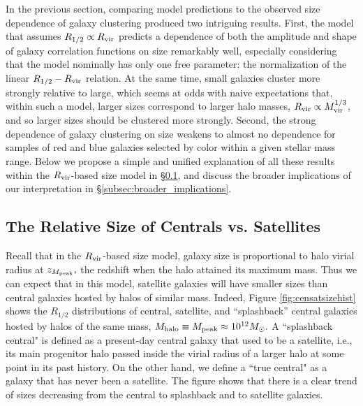 \documentclass[usenatbib,usegraphicx,letterpaper]{mn2e}
\newcommand{\rhalf}{R_{1/2}}
\newcommand{\mvir}{M_{\rm vir}}
\newcommand{\mpeak}{M_{\rm peak}}
\newcommand{\zpeak}{z_{M_{\rm peak}}}
\newcommand{\mhalo}{M_{\rm halo}}
\newcommand{\rvir}{R_{\rm vir}}
\newcommand{\msun}{M_\odot}
\begin{document}
In the previous section, comparing model predictions to the observed size dependence of galaxy clustering produced two intriguing results. First, the model that assumes $\rhalf\propto\rvir$ predicts a dependence of both the amplitude and shape of  galaxy correlation functions on size remarkably well, especially considering that the model nominally has only one free parameter: the normalization of the linear $\rhalf-\rvir$ relation. At the same time, small galaxies cluster more strongly relative to large, which seems at odds with naive expectations that, within such a model, larger sizes correspond to larger halo masses, $\rvir\propto\mvir^{1/3}$, and so larger sizes should be clustered more strongly. Second, the strong dependence of galaxy clustering on size weakens to almost no dependence for samples of red and blue galaxies selected by color within a given stellar mass range.
Below we propose a simple and unified explanation of all these results within the $\rvir$-based size model in \S\ref{subsec:censat_sizes}, and discuss the broader implications of our interpretation in \S\ref{subsec:broader_implications}.

\subsection{The Relative Size of Centrals vs. Satellites}
\label{subsec:censat_sizes}

Recall that in the $\rvir$-based size model, galaxy size is proportional to halo virial radius at $\zpeak,$ the redshift when the halo attained its maximum mass. Thus we can expect that in this model, satellite galaxies will have smaller sizes than  central galaxies hosted by halos of similar mass.  Indeed, Figure \ref{fig:censatsizehist} shows the $\rhalf$ distributions of central, satellite, and ``splashback'' central galaxies hosted by halos of the same mass, $\mhalo\equiv\mpeak\approx10^{12}\msun.$ A ``splashback central"  is defined as a present-day central galaxy that used to be a satellite, i.e., its main progenitor halo passed inside the virial radius of a larger halo at some point in its past history. On the other hand, we define a ``true central" as a galaxy that has never been a satellite. The figure shows that there is a clear trend of sizes decreasing from the central to splashback and to satellite galaxies.
\end{document}
